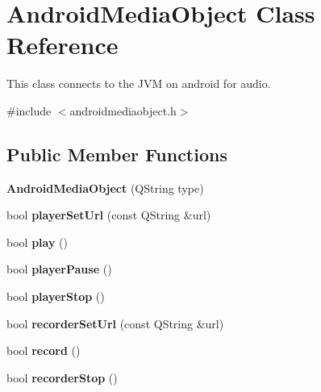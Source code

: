 \hypertarget{classAndroidMediaObject}{\section{Android\-Media\-Object Class Reference}
\label{classAndroidMediaObject}
}


This class connects to the J\-V\-M on android for audio.  




{\ttfamily \#include $<$androidmediaobject.\-h$>$}

\subsection*{Public Member Functions}
\begin{DoxyCompactItemize}
\item 
\hypertarget{classAndroidMediaObject_ab0db901f53d0aaf6086a2de6f31b2c96}{{\bfseries Android\-Media\-Object} (Q\-String type)}\label{classAndroidMediaObject_ab0db901f53d0aaf6086a2de6f31b2c96}

\item 
\hypertarget{classAndroidMediaObject_a5d27e56300192c1b53e9a0e84d839683}{bool {\bfseries player\-Set\-Url} (const Q\-String \&url)}\label{classAndroidMediaObject_a5d27e56300192c1b53e9a0e84d839683}

\item 
\hypertarget{classAndroidMediaObject_a62dc942d675293675b1e83a1cfa4f543}{bool {\bfseries play} ()}\label{classAndroidMediaObject_a62dc942d675293675b1e83a1cfa4f543}

\item 
\hypertarget{classAndroidMediaObject_ac983dc664368abd8751f24bdb38f2ca9}{bool {\bfseries player\-Pause} ()}\label{classAndroidMediaObject_ac983dc664368abd8751f24bdb38f2ca9}

\item 
\hypertarget{classAndroidMediaObject_ab8ea0f196b02647ee9129a0703b0259b}{bool {\bfseries player\-Stop} ()}\label{classAndroidMediaObject_ab8ea0f196b02647ee9129a0703b0259b}

\item 
\hypertarget{classAndroidMediaObject_aa8fc0ca1a6e73ebbd1e1a459cdd2201d}{bool {\bfseries recorder\-Set\-Url} (const Q\-String \&url)}\label{classAndroidMediaObject_aa8fc0ca1a6e73ebbd1e1a459cdd2201d}

\item 
\hypertarget{classAndroidMediaObject_a40c0136098410068ed9072d55f828419}{bool {\bfseries record} ()}\label{classAndroidMediaObject_a40c0136098410068ed9072d55f828419}

\item 
\hypertarget{classAndroidMediaObject_a00b2ced321cdd44ba1df3c5c03c3c3a4}{bool {\bfseries recorder\-Stop} ()}\label{classAndroidMediaObject_a00b2ced321cdd44ba1df3c5c03c3c3a4}

\end{DoxyCompactItemize}
